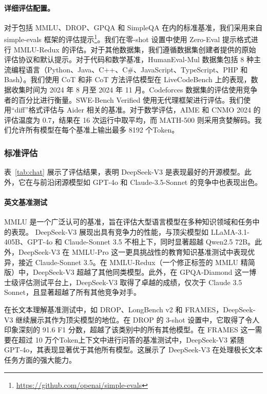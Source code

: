\documentclass[lang=cn,a4paper,newtx]{elegantpaper}
\newcommand{\dsviii}{DeepSeek-V3}
\begin{document}
\paragraph{详细评估配置。}
对于包括 MMLU、DROP、GPQA 和 SimpleQA 在内的标准基准，我们采用来自 simple-evals 框架的评估提示\footnote{\url{https://github.com/openai/simple-evals}}。我们在零-shot 设置中使用 Zero-Eval 提示格式进行 MMLU-Redux 的评估。对于其他数据集，我们遵循数据集创建者提供的原始评估协议和默认提示。对于代码和数学基准，HumanEval-Mul 数据集包括 8 种主流编程语言（Python、Java、C++、C\#、JavaScript、TypeScript、PHP 和 Bash）。我们使用 CoT 和非 CoT 方法评估模型在 LiveCodeBench 上的表现，数据收集时间为 2024 年 8 月至 2024 年 11 月。Codeforces 数据集的评估使用竞争者的百分比进行衡量。SWE-Bench Verified 使用无代理框架进行评估。我们使用“diff”格式评估与 Aider 相关的基准。对于数学评估，AIME 和 CNMO 2024 的评估温度为 0.7，结果在 16 次运行中取平均，而 MATH-500 则采用贪婪解码。我们允许所有模型在每个基准上输出最多 8192 个Token。



\subsubsection{标准评估}

表~\ref{tab:chat} 展示了评估结果，表明 \dsviii{} 是表现最好的开源模型。此外，它在与前沿闭源模型如 GPT-4o 和 Claude-3.5-Sonnet 的竞争中也表现出色。

\paragraph{英文基准测试}
MMLU 是一个广泛认可的基准，旨在评估大型语言模型在多种知识领域和任务中的表现。 \dsviii{} 展现出具有竞争力的性能，与顶尖模型如 LLaMA-3.1-405B、GPT-4o 和 Claude-Sonnet 3.5 不相上下，同时显著超越 Qwen2.5 72B。此外，\dsviii{} 在 MMLU-Pro 这一更具挑战性的教育知识基准测试中表现优异，接近 Claude-Sonnet 3.5。在 MMLU-Redux（一个修正标签的 MMLU 精简版）中，\dsviii{} 超越了其他同类模型。此外，在 GPQA-Diamond 这一博士级评估测试平台上，\dsviii{} 取得了卓越的成绩，仅次于 Claude 3.5 Sonnet，且显著超越了所有其他竞争对手。

在长文本理解基准测试中，如 DROP、LongBench v2 和 FRAMES，\dsviii{} 继续展示其作为顶尖模型的地位。在 DROP 的 3-shot 设置中，它取得了令人印象深刻的 91.6 F1 分数，超越了该类别中的所有其他模型。在 FRAMES 这一需要在超过 10 万个Token上下文中进行问答的基准测试中，\dsviii{} 紧随 GPT-4o，其表现显著优于其他所有模型。这展示了 \dsviii{} 在处理极长文本任务方面的强大能力。
\end{document}

